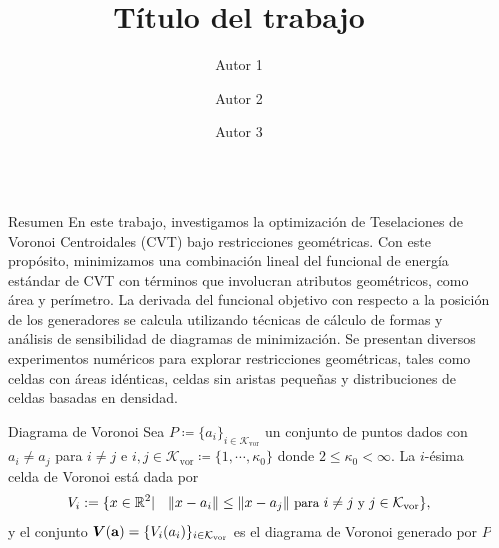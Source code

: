 \documentclass[final]{beamer}
\title{\LARGE Título del trabajo}
\author{\large Autor 1 \inst{1} \and Autor 2 \inst{1} \and Autor 3 \inst{2}}
\institute[shortinst]{\inst{1} Universidad 1 \samelineand \inst{2} Universidad 2}
\newcommand{\R}{\mathbb{R}}
\newcommand{\bsi}{{\bf a}}
\newcommand{\K}{\mathcal{K}_{\text{vor}}}
\newcommand{\mV}{\bm{V}}
\newlength{\sepwidth}
\newlength{\colwidth}
\newcommand{\separatorcolumn}{\begin{column}{\sepwidth}\end{column}}
\begin{document}
\begin{frame}[t]

\begin{columns}[t]
\separatorcolumn
\begin{column}{\colwidth}

\begin{block}{Resumen}
En este trabajo, investigamos la optimización de Teselaciones de Voronoi Centroidales (CVT) bajo restricciones geométricas. Con este propósito, minimizamos una combinación lineal del funcional de energía estándar de CVT con términos que involucran atributos geométricos, como área y perímetro. La derivada del funcional objetivo con respecto a la posición de los generadores se calcula utilizando técnicas de cálculo de formas y análisis de sensibilidad de diagramas de minimización. Se presentan diversos experimentos numéricos para explorar restricciones geométricas, tales como celdas con áreas idénticas, celdas sin aristas pequeñas y distribuciones de celdas basadas en densidad.
\end{block}

\begin{block}{Diagrama de Voronoi}
Sea $P\coloneq\lbrace a_i \rbrace_{i\in\K}$ un conjunto de puntos dados con $a_i\neq a_j$ para $i\neq j$ e $i,j\in \K\coloneq\lbrace 1, \cdots, \kappa_0 \rbrace$ donde $2\leq\kappa_0 < \infty$. La $i$-ésima celda de Voronoi está dada por
\begin{equation}
\small V_i := \lbrace x\in \R^2|\quad \|x-a_i\| \leq \| x-a_j \| \text{ para } i\neq j \text{ y } j\in \K  \rbrace,
\end{equation}
y el conjunto $\mV(\bsi)=\{V_i(a_i)\}_{i\in \K}$ es el diagrama de Voronoi generado por $P$
\end{block}


\end{column}
\end{columns}
\end{frame}
\end{document}
